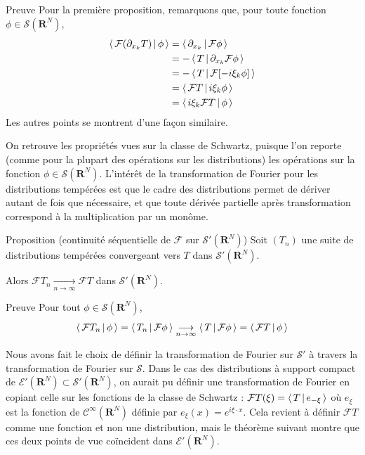         \begin{demo}{Preuve}
            Pour la première proposition, remarquons que, pour toute fonction $\phi \in \mathcal{S}(\mathbf{R}^N)$,
            \begin{align*}
                \left< \, \mathcal{F}(\partial_{x_k} T) \, \middle| \, \phi \, \right> 
                &= \left< \, \partial_{x_k} \, \middle| \, \mathcal{F}\phi \, \right> \\
                &= - \left< \, T \, \middle| \, \partial_{x_k} \mathcal{F}\phi \, \right> \\
                &= - \left< \, T \, \middle| \, \mathcal{F}[-i\xi_k\phi] \, \right> \\
                &= \left< \, \mathcal{F}T \, \middle| \, i \xi_k \phi \, \right> \\
                &= \left< \, i \xi_k \mathcal{F}T \, \middle| \, \phi \, \right>
            \end{align*}
            Les autres points se montrent d’une façon similaire.
        \end{demo}

        On retrouve les propriétés vues sur la classe de Schwartz, puisque l’on reporte (comme pour la plupart des opérations sur les distributions) les opérations sur la fonction $\phi \in \mathcal{S}(\mathbf{R}^N)$. L’intérêt de la transformation de Fourier pour les distributions tempérées est que le cadre des distributions permet de dériver autant de fois que nécessaire, et que toute dérivée partielle après transformation correspond à la multiplication par un monôme.

        \begin{omed}{Proposition (continuité séquentielle de $\mathcal{F}$ sur $\mathcal{S}'(\mathbf{R}^N)$)}
            Soit $(T_n)$ une suite de distributions tempérées convergeant vers $T$ dans $\mathcal{S}'(\mathbf{R}^N)$. 

            Alors $\mathcal{F}T_n \underset{n \to \infty}{\longrightarrow} \mathcal{F}T$ dans $\mathcal{S}'(\mathbf{R}^N)$.
        \end{omed}

        \begin{demo}{Preuve}
            Pour tout $\phi \in \mathcal{S}(\mathbf{R}^N)$, 
            \[ \left< \, \mathcal{F}T_n \, \middle| \, \phi \, \right> = \left< \, T_n \, \middle| \, \mathcal{F}\phi \, \right> \underset{n \to \infty }{\longrightarrow} \left< \, T \, \middle| \, \mathcal{F}\phi \, \right> = \left< \, \mathcal{F}T \, \middle| \, \phi \, \right> \]   
        \end{demo}

        Nous avons fait le choix de définir la transformation de Fourier sur $\mathcal{S}'$ à travers la transformation de Fourier sur $\mathcal{S}$. Dans le cas des distributions à support compact de $\mathcal{E}'(\mathbf{R}^N) \subset \mathcal{S}'(\mathbf{R}^N)$, on aurait pu définir une transformation de Fourier en copiant celle sur les fonctions de la classe de Schwartz : $\mathcal{F}T(\xi) = \left< \, T \, \middle| \, e_{-\xi} \, \right>$ où $e_{\xi}$ est la fonction de $\mathcal{C}^{\infty}(\mathbf{R}^N)$ définie par $e_{\xi}(x) = e^{i \xi \cdot x}$. Cela revient à définir $\mathcal{F}T$ comme une fonction et non une distribution, mais le théorème suivant montre que ces deux points de vue coïncident dans $\mathcal{E}'(\mathbf{R}^N)$.

